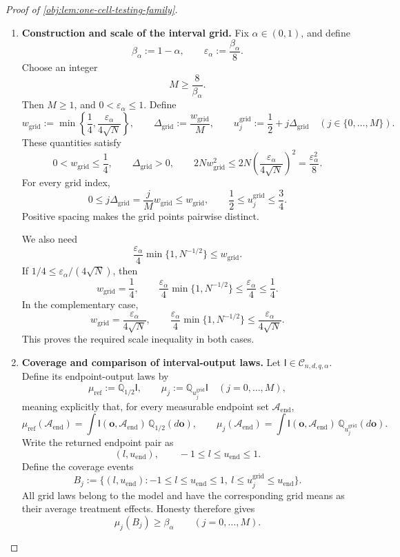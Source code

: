 \documentclass[11pt]{article}
\begin{document}
\begin{proof}[Proof of \cref{obj:lem:one-cell-testing-family}]
\begin{enumerate}
\item \textbf{Construction and scale of the interval grid.}
Fix \(\alpha\in(0,1)\), and define
\[
\beta_\alpha:=1-\alpha,
\qquad
\varepsilon_\alpha:=\frac{\beta_\alpha}{8}.
\]
Choose an integer
\[
M\ge\frac8{\beta_\alpha}.
\]
Then \(M\ge1\), and \(0<\varepsilon_\alpha\le1\). Define
\[
w_{\mathrm{grid}}
:=
\min\left\{\frac14,
           \frac{\varepsilon_\alpha}{4\sqrt N}\right\},
\qquad
\Delta_{\mathrm{grid}}:=\frac{w_{\mathrm{grid}}}{M},
\qquad
u_j^{\mathrm{grid}}
:=
\frac12+j\Delta_{\mathrm{grid}}
\quad(j\in\{0,\ldots,M\}).
\]
These quantities satisfy
\[
0<w_{\mathrm{grid}}\le\frac14,
\qquad
\Delta_{\mathrm{grid}}>0,
\qquad
2Nw_{\mathrm{grid}}^2
\le
2N\left(\frac{\varepsilon_\alpha}{4\sqrt N}\right)^2
=
\frac{\varepsilon_\alpha^2}{8}.
\]
For every grid index,
\[
0\le j\Delta_{\mathrm{grid}}
=\frac{j}{M}w_{\mathrm{grid}}
\le w_{\mathrm{grid}},
\qquad
\frac12\le u_j^{\mathrm{grid}}\le\frac34.
\]
Positive spacing makes the grid points pairwise distinct.

We also need
\[
\frac{\varepsilon_\alpha}{4}
\min\{1,N^{-1/2}\}
\le w_{\mathrm{grid}}.
\]
If \(1/4\le\varepsilon_\alpha/(4\sqrt N)\), then
\[
w_{\mathrm{grid}}=\frac14,
\qquad
\frac{\varepsilon_\alpha}{4}
\min\{1,N^{-1/2}\}
\le\frac{\varepsilon_\alpha}{4}\le\frac14.
\]
In the complementary case,
\[
w_{\mathrm{grid}}
=\frac{\varepsilon_\alpha}{4\sqrt N},
\qquad
\frac{\varepsilon_\alpha}{4}
\min\{1,N^{-1/2}\}
\le\frac{\varepsilon_\alpha}{4\sqrt N}.
\]
This proves the required scale inequality in both cases.

\item \textbf{Coverage and comparison of interval-output laws.}
Let \(\mathsf I\in\mathcal C_{n,d,q,\alpha}\). Define its endpoint-output laws by
\[
\mu_{\mathrm{ref}}
:=
\mathbb Q_{1/2}\mathsf I,
\qquad
\mu_j:=\mathbb Q_{u_j^{\mathrm{grid}}}\mathsf I
\quad(j=0,\ldots,M),
\]
meaning explicitly that, for every measurable endpoint set \(\mathscr A_{\mathrm{end}}\),
\[
\mu_{\mathrm{ref}}(\mathscr A_{\mathrm{end}})
=
\int\mathsf I(\boldsymbol o,\mathscr A_{\mathrm{end}})\,
     \mathbb Q_{1/2}(d\boldsymbol o),
\qquad
\mu_j(\mathscr A_{\mathrm{end}})
=
\int\mathsf I(\boldsymbol o,\mathscr A_{\mathrm{end}})\,
     \mathbb Q_{u_j^{\mathrm{grid}}}(d\boldsymbol o).
\]
Write the returned endpoint pair as
\[
(l,u_{\mathrm{end}}),\qquad -1\le l\le u_{\mathrm{end}}\le1.
\]
Define the coverage events
\[
B_j:=
\{(l,u_{\mathrm{end}}):-1\le l\le u_{\mathrm{end}}\le1,\ 
          l\le u_j^{\mathrm{grid}}\le u_{\mathrm{end}}\}.
\]
All grid laws belong to the model and have the corresponding grid means as their average treatment effects. Honesty therefore gives
\[
\mu_j(B_j)\ge\beta_\alpha
\qquad(j=0,\ldots,M).
\]


\end{enumerate}
\end{proof}
\end{document}
